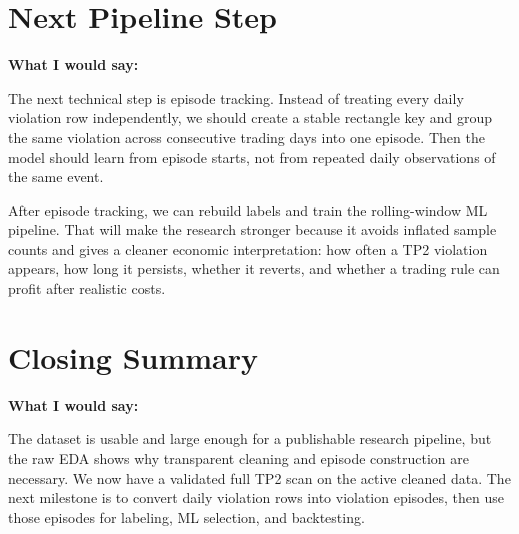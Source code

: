 \documentclass[11pt]{article}
\begin{document}
\section*{Next Pipeline Step}

\textbf{What I would say:}

The next technical step is episode tracking. Instead of treating every daily
violation row independently, we should create a stable rectangle key and group
the same violation across consecutive trading days into one episode. Then the
model should learn from episode starts, not from repeated daily observations of
the same event.

After episode tracking, we can rebuild labels and train the rolling-window ML
pipeline. That will make the research stronger because it avoids inflated
sample counts and gives a cleaner economic interpretation: how often a TP2
violation appears, how long it persists, whether it reverts, and whether a
trading rule can profit after realistic costs.

\section*{Closing Summary}

\textbf{What I would say:}

The dataset is usable and large enough for a publishable research pipeline, but
the raw EDA shows why transparent cleaning and episode construction are
necessary. We now have a validated full TP2 scan on the active cleaned data.
The next milestone is to convert daily violation rows into violation episodes,
then use those episodes for labeling, ML selection, and backtesting.
\end{document}
